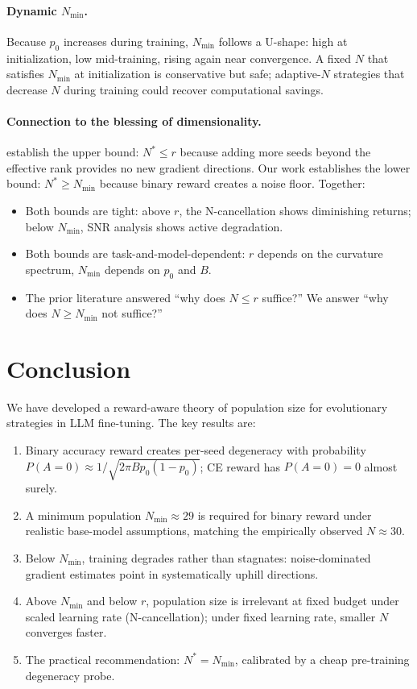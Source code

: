 \documentclass[11pt]{article}
\theoremstyle{definition}
\theoremstyle{remark}
\newcommand{\Nmin}{N_{\mathrm{min}}}
\begin{document}
\paragraph{Dynamic $\Nmin$.}
Because $p_0$ increases during training, $\Nmin$ follows a U-shape: high at initialization, low mid-training, rising again near convergence. A fixed $N$ that satisfies $\Nmin$ at initialization is conservative but safe; adaptive-$N$ strategies that decrease $N$ during training could recover computational savings.

\paragraph{Connection to the blessing of dimensionality.}
\citet{liang2026blessing} establish the upper bound: $N^* \leq r$ because adding more seeds beyond the effective rank provides no new gradient directions. Our work establishes the lower bound: $N^* \geq \Nmin$ because binary reward creates a noise floor. Together:
\begin{itemize}[leftmargin=*]
  \item Both bounds are tight: above $r$, the N-cancellation shows diminishing returns; below $\Nmin$, SNR analysis shows active degradation.
  \item Both bounds are task-and-model-dependent: $r$ depends on the curvature spectrum, $\Nmin$ depends on $p_0$ and $B$.
  \item The prior literature answered ``why does $N \leq r$ suffice?'' We answer ``why does $N \geq \Nmin$ not suffice?''
\end{itemize}

\section{Conclusion}
\label{sec:conclusion}

We have developed a reward-aware theory of population size for evolutionary strategies in LLM fine-tuning. The key results are:
\begin{enumerate}[leftmargin=*]
  \item Binary accuracy reward creates per-seed degeneracy with probability $P(A=0) \approx 1/\sqrt{2\pi Bp_0(1-p_0)}$; CE reward has $P(A=0) = 0$ almost surely.
  \item A minimum population $\Nmin \approx 29$ is required for binary reward under realistic base-model assumptions, matching the empirically observed $N \approx 30$.
  \item Below $\Nmin$, training degrades rather than stagnates: noise-dominated gradient estimates point in systematically uphill directions.
  \item Above $\Nmin$ and below $r$, population size is irrelevant at fixed budget under scaled learning rate (N-cancellation); under fixed learning rate, smaller $N$ converges faster.
  \item The practical recommendation: $N^* = \Nmin$, calibrated by a cheap pre-training degeneracy probe.
\end{enumerate}
\end{document}
